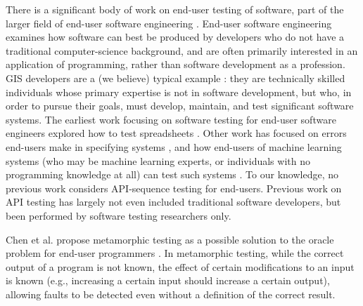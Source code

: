 There is a significant body of work on end-user testing of software,
part of the larger field of end-user software engineering
\cite{burnettEUSE,Silos}.  End-user software engineering examines how
software can best be produced by developers who do not have a
traditional computer-science background, and are often primarily
interested in an application of programming, rather than software
development as a profession.  GIS developers are a (we believe)
typical example \cite{Segal07}:  they are technically skilled  individuals whose
primary expertise is not in software development, but who, in order to
pursue their goals, must develop, maintain, and test significant
software systems.  The earliest work focusing on software testing for
end-user software engineers explored how to test spreadsheets
\cite{rothermelTOSEM,rothermel2000wysiwyt}.  Other work has focused on
errors end-users make in specifying systems \cite{Phalgune}, and how
end-users of machine learning systems (who may be machine learning
experts, or individuals with no programming knowledge at all) can test
such systems \cite{OnlyOracle,kulesza-eud11,shinsel-vlhcc}.  To our
knowledge, no previous work considers API-sequence testing for
end-users.  Previous work on API testing has largely not even included
traditional software developers, but been performed by software
testing researchers only.

Chen et al. propose metamorphic testing \cite{MetaTest,isstamorph,metamorph,chentest} as a possible
solution to the oracle problem for end-user programmers
\cite{MetamorphEndUser}.  In metamorphic testing, while the correct
output of a program is not known, the effect of certain
modifications to an input is known (e.g., increasing a certain input
should increase a certain output), allowing faults to be detected
even without a definition of the correct result.
